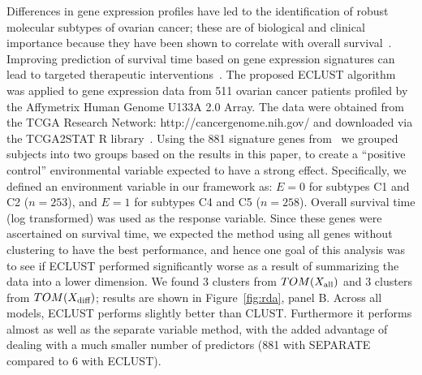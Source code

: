 Differences in gene expression profiles have led to the identification of robust molecular subtypes of ovarian cancer; these are of biological and clinical importance because they have been shown to correlate with overall survival~\citep{tothill2008novel}. Improving prediction of survival time based on gene expression signatures can lead to targeted therapeutic interventions~\citep{helland2011deregulation}. The proposed ECLUST algorithm was applied to gene expression data from 511 ovarian cancer patients profiled by the Affymetrix Human Genome U133A 2.0 Array. The data were obtained from the TCGA Research Network: http://cancergenome.nih.gov/ and downloaded via the TCGA2STAT R library~\citep{tcga2stat}. Using the 881 signature genes from~\cite{helland2011deregulation} we grouped subjects into two groups based on the results in this paper, to create a ``positive control'' environmental variable expected to have a strong effect. Specifically, we defined an environment variable in our framework as: $E=0$ for subtypes C1 and C2 ($n = 253$), and $E=1$ for subtypes C4 and C5 ($n = 258$). Overall survival time (log transformed) was used as the response variable. Since these genes were ascertained on survival time, we expected the method using all genes without clustering to have the best performance, and hence one goal of this analysis was to see if ECLUST performed significantly worse as a result of summarizing the data into a lower dimension. We found 3 clusters from $TOM(X_{\textrm{{all}}})$ and 3 clusters from $TOM(X_{\textrm{{diff}}})$;  results are shown in Figure~\ref{fig:rda}, panel B. Across all models, ECLUST performs slightly better than CLUST. Furthermore it performs almost as well as the separate variable method, with the added advantage of dealing with a much smaller number of predictors (881 with SEPARATE compared to 6 with ECLUST).  

